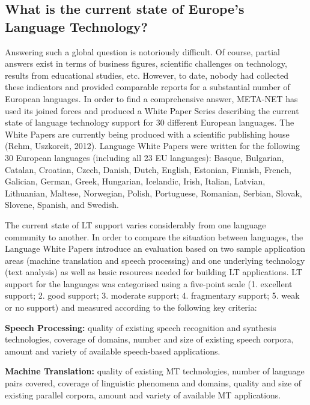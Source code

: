 \begin{multicols}{2}

\subsection{What is the current state of Europe’s Language Technology?}
\label{sec:what-current-state}

Answering such a global question is notoriously difficult. Of course, partial answers exist in terms of business figures, scientific challenges on technology, results from educational studies, etc. However, to date, nobody had collected these indicators and provided comparable reports for a substantial number of European languages. In order to find a comprehensive answer, META-NET has used its joined forces and produced a White Paper Series describing the current state of language technology support for 30 different European languages. The White Papers are currently being produced with a scientific publishing house (Rehm, Uszkoreit, 2012). Language White Papers were written for the following 30 European languages (including all 23 EU languages): Basque, Bulgarian, Catalan, Croatian, Czech, Danish, Dutch, English, Estonian, Finnish, French, Galician, German, Greek, Hungarian, Icelandic, Irish, Italian, Latvian, Lithuanian, Maltese, Norwegian, Polish, Portuguese, Romanian, Serbian, Slovak, Slovene, Spanish, and Swedish.

The current state of LT support varies considerably from one language community to another. In order to compare the situation between languages, the Language White Papers introduce an evaluation based on two sample application areas (machine translation and speech processing) and one underlying technology (text analysis) as well as basic resources needed for building LT applications. LT support for the languages was categorised using a five-point scale (1. excellent support; 2. good support; 3. moderate support; 4. fragmentary support; 5. weak or no support) and measured according to the following key criteria:

\textbf{Speech Processing:} quality of existing speech recognition and synthesis technologies, coverage of domains, number and size of existing speech corpora, amount and variety of available speech-based applications.

\textbf{Machine Translation:} quality of existing MT technologies, number of language pairs covered, coverage of linguistic phenomena and domains, quality and size of existing parallel corpora, amount and variety of available MT applications.


\end{multicols}
